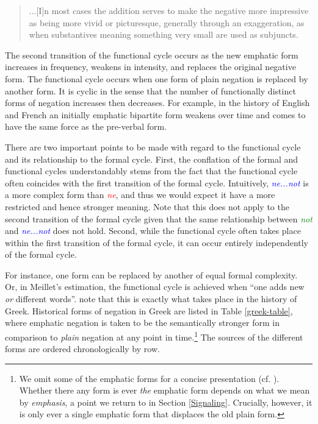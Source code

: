 \documentclass[linguex]{sp}
\theoremstyle{definition} \newtheorem{definition}{Definition}
\begin{document}
\begin{quotation}
...[I]n most cases the addition serves to make the negative more impressive as being more vivid or picturesque, generally through an exaggeration, as when substantives meaning something very small are used as subjuncts.
\end{quotation}

The second transition of the functional cycle occurs as the new emphatic form increases in frequency, weakens in intensity, and replaces the original negative form. The functional cycle occurs when one form of plain negation is replaced by another form. It is cyclic in the sense that the number of functionally distinct forms of negation increases then decreases. For example, in the history of English and French an initially emphatic bipartite form weakens over time and comes to have the same force as the pre-verbal form.

There are two important points to be made with regard to the functional cycle and its relationship to the formal cycle. First, the conflation of the formal and functional cycles understandably stems from the fact that the functional cycle often coincides with the first transition of the formal cycle.  Intuitively, \emph{\textcolor{blue}{ne...not}} is a more complex form than  \emph{\textcolor{red}{ne}}, and thus we would expect it have a more restricted and hence stronger meaning. Note that this does not apply to the second transition of the formal cycle given that the same relationship between \emph{\textcolor{green}{not}} and \emph{\textcolor{blue}{ne...not}} does not hold.  Second, while the functional cycle often takes place within the first transition of the formal cycle, it can occur entirely independently of the formal cycle.  

For instance, one form can be replaced by another of equal formal complexity.  Or, in Meillet's \citeyearpar[134]{meillet1912} estimation, the functional cycle is achieved when ``one adds  new \emph{or} different words''.  \cite{kiparsky-condoravdi:2006} note that this is exactly what takes place in the history of Greek. Historical forms of negation in Greek are listed in Table \ref{greek-table}, where emphatic negation is taken to be the semantically stronger form in comparison to \emph{plain} negation at any point in time.\footnote{We omit some of the emphatic forms for a concise presentation (cf. \citealt[1]{kiparsky-condoravdi:2006}). Whether there any form is ever  \emph{the} emphatic form depends on what we mean by \emph{emphasis}, a point we return to in Section \ref{Signaling}. Crucially, however, it is only ever a single emphatic form that displaces the old plain form.} The sources of the different forms are ordered chronologically by row.
\end{document}
